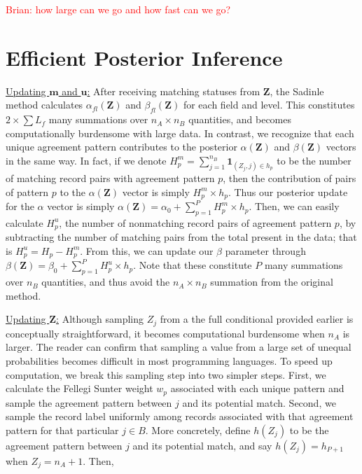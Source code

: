 \documentclass[12pt,letterpaper]{article}
\newcommand{\1}[1]{\mathbb{I}\!\left[#1\right]} %
\begin{document}
\textcolor{red}{Brian: how large can we go and how fast can we go?}


\section{Efficient Posterior Inference}\label{sec:efficient-posterior}

\underline{Updating $\mathbf{m}$ and $\mathbf{u}$:} After receiving
matching statuses from \(\mathbf{Z}\), the Sadinle method calculates
\(\alpha_{fl}(\mathbf{Z})\) and \(\beta_{fl}(\mathbf{Z})\) for each
field and level. This constitutes \(2 \times \sum L_f\) many summations
over \(n_A \times n_B\) quantities, and becomes computationally
burdensome with large data. In contrast, we recognize that each unique
agreement pattern contributes to the posterior \(\alpha(\mathbf{Z})\)
and \(\beta(\mathbf{Z})\) vectors in the same way. In fact, if we denote
\(H_p^m = \sum_{j=1}^{n_B} \mathbf{1}_{(Z_j, j) \in h_p}\) to be the
number of matching record pairs with agreement pattern \(p\), then the
contribution of pairs of pattern \(p\) to the \(\alpha(\mathbf{Z})\)
vector is simply \(H_p^m \times h_p\). Thus our posterior update for the
\(\alpha\) vector is simply
\(\alpha(\mathbf{Z}) = \alpha_0 + \sum_{p=1}^P H_p^m \times h_p\). Then,
we can easily calculate \(H_p^u\), the number of nonmatching record
pairs of agreement pattern \(p\), by subtracting the number of matching
pairs from the total present in the data; that is
\(H_p^u = H_p - H_p^m\). From this, we can update our \(\beta\)
parameter through
\(\beta(\mathbf{Z}) = \beta_0 + \sum_{p=1}^P H_p^u \times h_p\). Note
that these constitute \(P\) many summations over \(n_B\) quantities, and
thus avoid the \(n_A \times n_B\) summation from the original method.

\underline{Updating $\mathbf{Z}$:} Although sampling \(Z_j\) from a the
full conditional provided earlier is conceptually straightforward, it
becomes computational burdensome when \(n_A\) is larger. The reader can
confirm that sampling a value from a large set of unequal probabilities
becomes difficult in most programming languages. To speed up
computation, we break this sampling step into two simpler steps. First,
we calculate the Fellegi Sunter weight \(w_{p}\) associated with each
unique pattern and sample the agreement pattern between \(j\) and its
potential match. Second, we sample the record label uniformly among
records associated with that agreement pattern for that particular
\(j\in B\). More concretely, define \(h(Z_j)\) to be the agreement
pattern between \(j\) and its potential match, and say
\(h(Z_j) = h_{P+1}\) when \(Z_j = n_A + 1\). Then,
\end{document}
